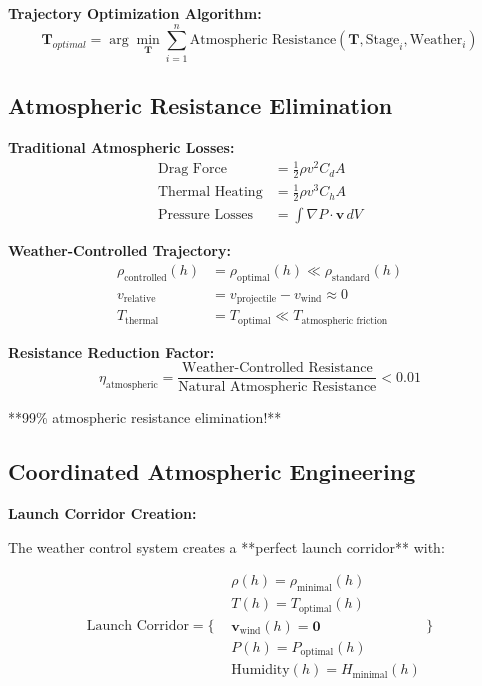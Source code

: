 \documentclass[12pt,a4paper]{article}
\begin{document}
\textbf{Trajectory Optimization Algorithm:}
\begin{equation}
\mathbf{T}_{optimal} = \arg\min_{\mathbf{T}} \sum_{i=1}^{n} \text{Atmospheric Resistance}(\mathbf{T}, \text{Stage}_i, \text{Weather}_i)
\end{equation}

\subsection{Atmospheric Resistance Elimination}

\textbf{Traditional Atmospheric Losses:}
\begin{align}
\text{Drag Force} &= \frac{1}{2}\rho v^2 C_d A \\
\text{Thermal Heating} &= \frac{1}{2}\rho v^3 C_h A \\
\text{Pressure Losses} &= \int \nabla P \cdot \mathbf{v} \, dV
\end{align}

\textbf{Weather-Controlled Trajectory:}
\begin{align}
\rho_{\text{controlled}}(h) &= \rho_{\text{optimal}}(h) \ll \rho_{\text{standard}}(h) \\
v_{\text{relative}} &= v_{\text{projectile}} - v_{\text{wind}} \approx 0 \\
T_{\text{thermal}} &= T_{\text{optimal}} \ll T_{\text{atmospheric friction}}
\end{align}

\textbf{Resistance Reduction Factor:}
\begin{equation}
\eta_{\text{atmospheric}} = \frac{\text{Weather-Controlled Resistance}}{\text{Natural Atmospheric Resistance}} < 0.01
\end{equation}

**99\% atmospheric resistance elimination!**

\subsection{Coordinated Atmospheric Engineering}

\textbf{Launch Corridor Creation:}

The weather control system creates a **perfect launch corridor** with:

\begin{equation}
\text{Launch Corridor} = \{
\begin{aligned}
&\rho(h) = \rho_{\text{minimal}}(h) \\
&T(h) = T_{\text{optimal}}(h) \\
&\mathbf{v}_{\text{wind}}(h) = \mathbf{0} \\
&P(h) = P_{\text{optimal}}(h) \\
&\text{Humidity}(h) = H_{\text{minimal}}(h)
\end{aligned}
\}
\end{equation}
\end{document}
